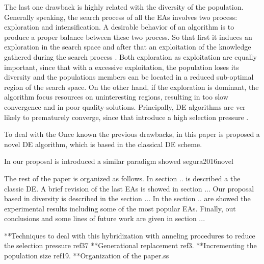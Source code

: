 %
The last one drawback is highly related with the diversity of the population.
%
Generally speaking, the search process of all the EAs involves two process: exploration and intensification.
%
A desirable behavior of an algorithm is to produce a proper balance between these two process.
%
So that first it induces an exploration in the search space and after that an exploitation of the knowledge gathered during the search process \cite{zaharie2003control}.
%
Both exploration as exploitation are equally important, since that with a excessive exploitation, the population loses its diversity and the populations members can be located in a reduced sub-optimal region of the search space.
%
On the other hand, if the exploration is dominant, the algorithm focus resources on uninteresting regions, resulting in too slow convergence and in poor quality-solutions.
%
Principally, DE algorithms are ver likely to prematurely converge, since that introduce a high selection pressure \cite{sa2008exploration}.
%

To deal with the 
Once known the previous drawbacks, in this paper is proposed a novel DE algorithm, which is based in the classical DE scheme.
%



In our proposal is introduced a similar paradigm showed segura2016novel
%



The rest of the paper is organized as follows.
%
In section .. is described a the classic DE.
%
A brief revision of the last EAs is showed in section ...
%
Our proposal based in diversity is described in the section ...
%
In the section .. are showed the experimental results including some of the most popular EAs.
%
Finally, out conclusions and some lines of future work are given in section ...

   **Techniques to deal with this hybridization with anneling procedures to reduce the selection pressure ref37
   **Generational replacement ref3.
   **Incrementing the population size ref19.
**Organization of the paper.ss
